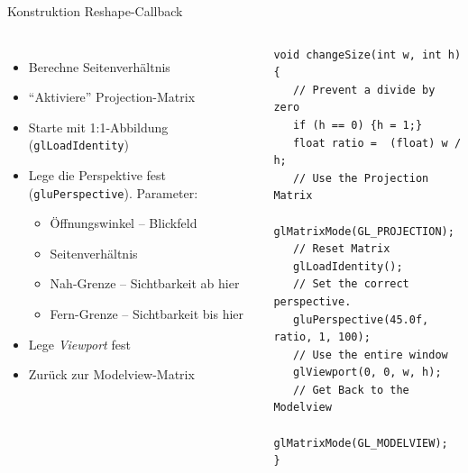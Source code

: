 \begin{frame}[fragile]{Konstruktion Reshape-Callback}
%
\begin{columns}[T]
\begin{itemize}
\item Berechne Seitenverhältnis
\item \enquote{Aktiviere} Projection-Matrix
\item Starte mit 1:1-Abbildung (\texttt{glLoadIdentity})
\item Lege die Perspektive fest (\texttt{gluPerspective}). Parameter:
	\begin{itemize}
	\item Öffnungswinkel -- Blickfeld
	\item Seitenverhältnis
	\item Nah-Grenze -- Sichtbarkeit ab hier
	\item Fern-Grenze -- Sichtbarkeit bis hier
	\end{itemize}
\item Lege \emph{Viewport} fest
\item Zurück zur Modelview-Matrix
\end{itemize}
%
\vspace{-10pt}
\begin{codebox}%
\begin{verbatim}
void changeSize(int w, int h) {
   // Prevent a divide by zero
   if (h == 0) {h = 1;}
   float ratio =  (float) w / h;
   // Use the Projection Matrix
   glMatrixMode(GL_PROJECTION);
   // Reset Matrix
   glLoadIdentity();
   // Set the correct perspective.
   gluPerspective(45.0f, ratio, 1, 100);
   // Use the entire window
   glViewport(0, 0, w, h);
   // Get Back to the Modelview
   glMatrixMode(GL_MODELVIEW);
}
\end{verbatim}
\end{codebox}
\end{columns}
%
\end{frame}


